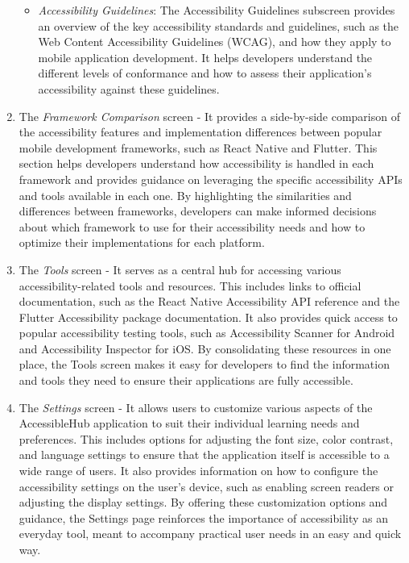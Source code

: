 \begin{enumerate}
\begin{itemize}
        \item \textit{Accessibility Guidelines}: The Accessibility Guidelines subscreen provides an overview of the key accessibility standards and guidelines, such as the Web Content Accessibility Guidelines (WCAG), and how they apply to mobile application development. It helps developers understand the different levels of conformance and how to assess their application's accessibility against these guidelines.
    \end{itemize}

\item The \textit{Framework Comparison} screen - It provides a side-by-side comparison of the accessibility features and implementation differences between popular mobile development frameworks, such as React Native and Flutter. This section helps developers understand how accessibility is handled in each framework and provides guidance on leveraging the specific accessibility APIs and tools available in each one. By highlighting the similarities and differences between frameworks, developers can make informed decisions about which framework to use for their accessibility needs and how to optimize their implementations for each platform.

\item The \textit{Tools} screen - It serves as a central hub for accessing various accessibility-related tools and resources. This includes links to official documentation, such as the React Native Accessibility API reference and the Flutter Accessibility package documentation. It also provides quick access to popular accessibility testing tools, such as Accessibility Scanner for Android and Accessibility Inspector for iOS. By consolidating these resources in one place, the Tools screen makes it easy for developers to find the information and tools they need to ensure their applications are fully accessible.

\item The \textit{Settings} screen - It allows users to customize various aspects of the AccessibleHub application to suit their individual learning needs and preferences. This includes options for adjusting the font size, color contrast, and language settings to ensure that the application itself is accessible to a wide range of users. It also provides information on how to configure the accessibility settings on the user's device, such as enabling screen readers or adjusting the display settings. By offering these customization options and guidance, the Settings page reinforces the importance of accessibility as an everyday tool, meant to accompany practical user needs in an easy and quick way.\\
    
\end{enumerate}

